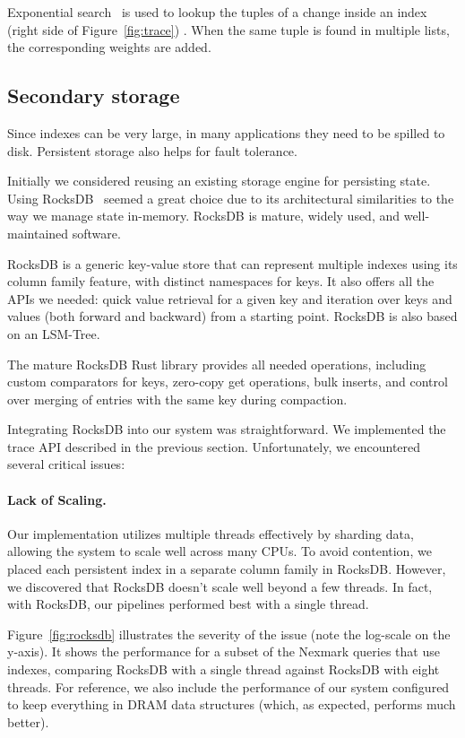 Exponential search~\cite{bentley-ipl76} is used to lookup the tuples
of a change inside an index (right side of Figure~\ref{fig:trace}) .
When the same tuple is found in multiple lists, the corresponding
weights are added.

\subsection{Secondary storage}

Since indexes can be very large, in many applications they need to be
spilled to disk.  Persistent storage also helps for fault tolerance.

Initially we considered reusing an existing storage engine for
persisting state.  Using RocksDB~\cite{dong-ats21} seemed a great
choice due to its architectural similarities to the way we manage state
in-memory.  RocksDB is mature, widely used, and well-maintained
software.

RocksDB is a generic key-value store that can represent multiple
indexes using its column family feature, with distinct namespaces for
keys. It also offers all the APIs we needed: quick value retrieval for
a given key and iteration over keys and values (both forward and
backward) from a starting point.  RocksDB is also based on an
LSM-Tree.

The mature RocksDB Rust library provides all need\-ed operations,
including custom comparators for keys, zero-copy get operations, bulk
inserts, and control over merging of entries with the same key during
compaction.

Integrating RocksDB into our system was straightforward.  We
implemented the trace API described in the previous section.
Unfortunately, we encountered several critical issues:

\paragraph{Lack of Scaling.} Our implementation utilizes multiple threads
effectively by sharding data, allowing the system to scale well across
many CPUs.  To avoid contention, we placed each persistent index in a
separate column family in RocksDB. However, we discovered that RocksDB
doesn't scale well beyond a few threads. In fact, with RocksDB, our
pipelines performed best with a single thread.

Figure~\ref{fig:rocksdb} illustrates the severity of the issue (note
the log-scale on the y-axis). It shows the performance for a subset of
the Nexmark queries that use indexes, comparing RocksDB with a single
thread against RocksDB with eight threads. For reference, we also
include the performance of our system configured to keep everything in
DRAM data structures (which, as expected, performs much better).

